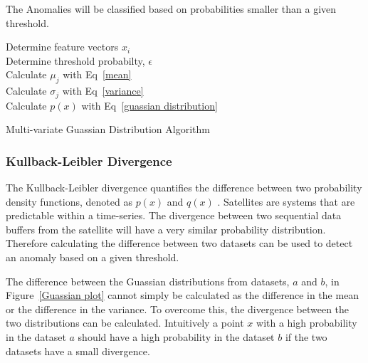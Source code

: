 The Anomalies will be classified based on probabilities smaller than a given threshold.

\begin{algorithm}


\Indm
{}
\Indp
\BlankLine

Determine feature vectors $x_i$ \\
Determine threshold probabilty, $\epsilon$ \\
Calculate $\mu_j$ with Eq~\ref{mean} \\
Calculate $\sigma_j$ with Eq~\ref{variance} \\
Calculate $p(x)$ with Eq~\ref{guassian distribution} \\

\caption[Multi-variate Guassian Distribution]{Multi-variate Guassian Distribution Algorithm}
\label{alg}
\end{algorithm}

\subsubsection{Kullback-Leibler Divergence}
The Kullback-Leibler divergence quantifies the difference between two probability density functions, denoted as $p(x)$ and $q(x)$ \cite{hershey2007approximating}. Satellites are systems that are predictable within a time-series. The divergence between two sequential data buffers from the satellite will have a very similar probability distribution. Therefore calculating the difference between two datasets can be used to detect an anomaly based on a given threshold.

The difference between the Guassian distributions from datasets, $a$ and $b$, in Figure~\ref{Guassian plot} cannot simply be calculated as the difference in the mean or the difference in the variance. To overcome this, the divergence between the two distributions can be calculated. Intuitively a point $x$ with a high probability in the dataset $a$ should have a high probability in the dataset $b$ if the two datasets have a small divergence. 

